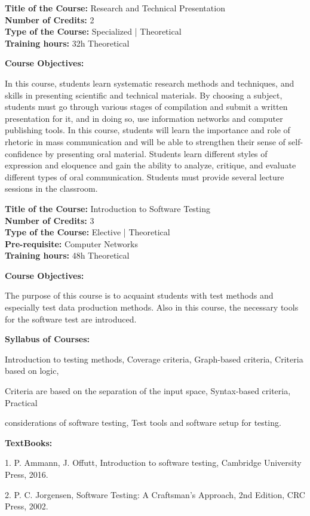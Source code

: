 \documentclass[12pt,a4paper]{article}
\begin{document}
\newpage
\textbf{Title of the Course:} Research and Technical Presentation\\
\textbf{Number of Credits:} 2\\
\textbf{Type of the Course:} Specialized | Theoretical\\
\textbf{Training hours:} 32h Theoretical\par\vspace{4pt}
\textbf{Course Objectives:}\par\vspace{2pt}
In this course, students learn systematic research methods and techniques, and skills in presenting
scientific and technical materials. By choosing a subject, students must go through various stages
of compilation and submit a written presentation for it, and in doing so, use information networks
and computer publishing tools. In this course, students will learn the importance and role of
rhetoric in mass communication and will be able to strengthen their sense of self-confidence by
presenting oral material. Students learn different styles of expression and eloquence and gain the
ability to analyze, critique, and evaluate different types of oral communication. Students must
provide several lecture sessions in the classroom.\par\vspace{4pt}

\newpage
\textbf{Title of the Course:} Introduction to Software Testing\\
\textbf{Number of Credits:} 3\\
\textbf{Type of the Course:} Elective | Theoretical\\
\textbf{Pre-requisite:} Computer Networks\\
\textbf{Training hours:} 48h Theoretical\par\vspace{4pt}
\textbf{Course Objectives:}\par\vspace{2pt}
The purpose of this course is to acquaint students with test methods and especially test data
production methods. Also in this course, the necessary tools for the software test are introduced.\par\vspace{4pt}
\textbf{Syllabus of Courses:}\par\vspace{2pt}
Introduction to testing methods, Coverage criteria, Graph-based criteria, Criteria based on logic,\par
Criteria are based on the separation of the input space, Syntax-based criteria, Practical\par
considerations of software testing, Test tools and software setup for testing.\par\vspace{4pt}
\textbf{TextBooks:}\par\vspace{2pt}
1. P. Ammann, J. Offutt, Introduction to software testing, Cambridge University Press, 2016.\par
2. P. C. Jorgensen, Software Testing: A Craftsman's Approach, 2nd Edition, CRC Press, 2002.\par
\vspace{4pt}
\end{document}
